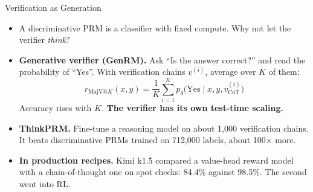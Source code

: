 \begin{frame}{Verification as Generation}
    \begin{itemize}\itemsep0.4em
        \item A discriminative PRM is a classifier with fixed compute. Why not let the verifier \emph{think}?
        \item \textbf{Generative verifier (GenRM).} Ask ``Is the answer correct?'' and read the probability of ``Yes''. With verification chains $v^{(i)}$, average over $K$ of them:
        \[
            r_{\text{MajV@}K}(x,y)=\frac{1}{K}\sum_{i=1}^{K}p_\theta\big(\text{Yes}\mid x,y,v^{(i)}_{\text{CoT}}\big)
        \]
        Accuracy rises with $K$. \textbf{The verifier has its own test-time scaling.}
        \item \textbf{ThinkPRM.} Fine-tune a reasoning model on about 1,000 verification chains. It beats discriminative PRMs trained on 712,000 labels, about 100$\times$ more.
        \item \textbf{In production recipes.} Kimi k1.5 compared a value-head reward model with a chain-of-thought one on spot checks: 84.4\% against 98.5\%. The second went into RL.
    \end{itemize}
    \vspace{0.05em}
\end{frame}

